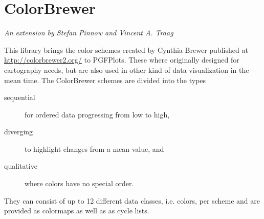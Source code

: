 {{%
}}

\section{ColorBrewer}

{\emph{An extension by Stefan Pinnow and Vincent A. Traag}}

This library brings the color schemes created by Cynthia Brewer published at
\url{http://colorbrewer2.org/} to PGFPlots. These where originally designed for
cartography needs, but are also used in other kind of data visualization in the
mean time. The ColorBrewer schemes are divided into the types
%
\begin{description}
    \item[sequential] for ordered data progressing from low to high,
    \item[diverging] to highlight changes from a mean value, and
    \item[qualitative] where colors have no special order.
\end{description}
%
They can consist of up to 12 different data classes, i.e. colors, per scheme
and are provided as colormaps as well as as cycle lists.

